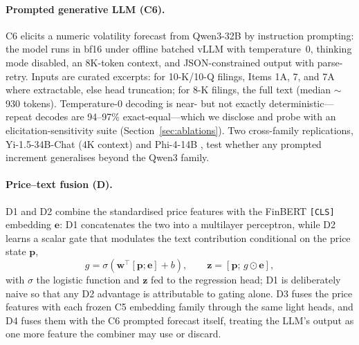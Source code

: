 \paragraph{Prompted generative LLM (C6).}
C6 elicits a numeric volatility forecast from Qwen3-32B \citep{qwen3_2025} by instruction prompting: the model runs in bf16 under offline batched vLLM \citep{kwon2023vllm} with temperature~0, thinking mode disabled, an 8K-token context, and JSON-constrained output with parse-retry. Inputs are curated excerpts: for 10-K/10-Q filings, Items 1A, 7, and 7A where extractable, else head truncation; for 8-K filings, the full text (median $\sim$930 tokens). Temperature-0 decoding is near- but not exactly deterministic---repeat decodes are 94--97\% exact-equal---which we disclose and probe with an elicitation-sensitivity suite (Section~\ref{sec:ablations}). Two cross-family replications, Yi-1.5-34B-Chat \citep{yi_2024} (4K context) and Phi-4-14B \citep{phi4_2024}, test whether any prompted increment generalises beyond the Qwen3 family.

\paragraph{Price--text fusion (D).}
D1 and D2 combine the standardised price features with the FinBERT \texttt{[CLS]} embedding $\mathbf{e}$: D1 concatenates the two into a multilayer perceptron, while D2 learns a scalar gate that modulates the text contribution conditional on the price state $\mathbf{p}$,
\begin{equation}
\label{eq:gate}
g=\sigma(\mathbf{w}^{\top}[\mathbf{p};\mathbf{e}]+b),\qquad
\mathbf{z}=[\mathbf{p};\,g\odot\mathbf{e}],
\end{equation}
with $\sigma$ the logistic function and $\mathbf{z}$ fed to the regression head; D1 is deliberately naive so that any D2 advantage is attributable to gating alone. D3 fuses the price features with each frozen C5 embedding family through the same light heads, and D4 fuses them with the C6 prompted forecast itself, treating the LLM's output as one more feature the combiner may use or discard.

